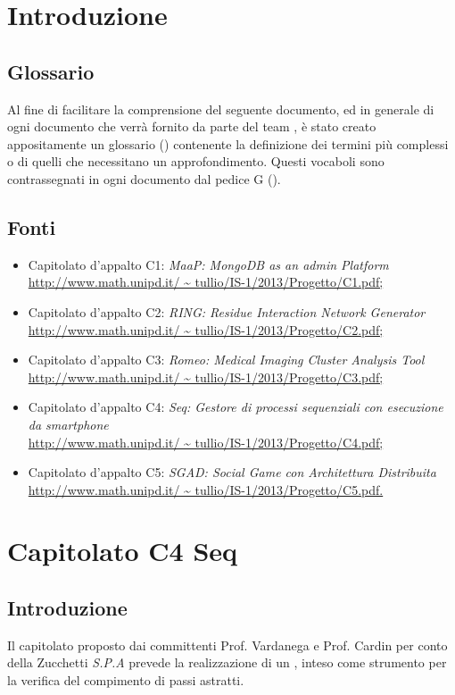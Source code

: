 \section{Introduzione}
\subsection{Glossario}
Al fine di facilitare la comprensione del seguente documento, ed in generale di ogni documento che verrà fornito da parte del team \gruppo , è stato creato appositamente un glossario (\textit{\Glossario}) contenente la definizione dei termini più complessi o di quelli che necessitano un approfondimento. Questi vocaboli sono contrassegnati in ogni documento dal pedice G ().
\subsection{Fonti}
\begin{itemize}
\item Capitolato d'appalto C1:\textit{ MaaP: MongoDB as an admin Platform} \\
\url{http://www.math.unipd.it/ ~ tullio/IS-1/2013/Progetto/C1.pdf;}
\item  Capitolato d'appalto C2: \textit{RING: Residue Interaction Network Generator}\\
\url{http://www.math.unipd.it/ ~ tullio/IS-1/2013/Progetto/C2.pdf;}
\item  Capitolato d'appalto C3: \textit{Romeo: Medical Imaging Cluster Analysis Tool}\\
\url{http://www.math.unipd.it/ ~ tullio/IS-1/2013/Progetto/C3.pdf;}
\item Capitolato d'appalto C4: \textit{Seq: Gestore di processi sequenziali con esecuzione da smartphone}\\
\url{http://www.math.unipd.it/ ~ tullio/IS-1/2013/Progetto/C4.pdf;}
\item Capitolato d'appalto C5:  \textit{SGAD: Social Game con Architettura Distribuita}\\
\url{http://www.math.unipd.it/ ~ tullio/IS-1/2013/Progetto/C5.pdf.}
\end{itemize}
\section{Capitolato C4 Seq}
\subsection{Introduzione}
Il capitolato proposto dai committenti Prof. Vardanega e Prof. Cardin per conto della Zucchetti \textit{S.P.A} prevede la realizzazione di un \progetto , inteso come strumento per la verifica del compimento di passi astratti.

